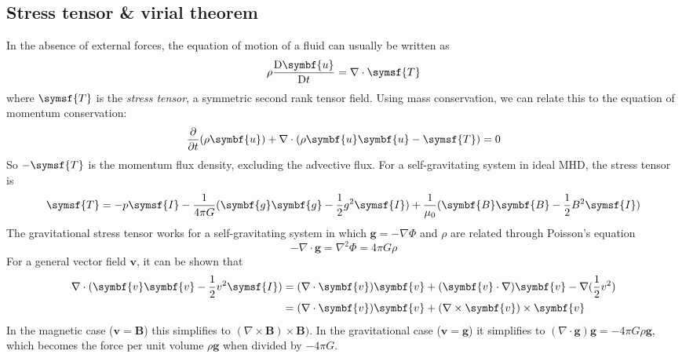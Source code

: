 \documentclass{jknotes}
\newcommand{\B}{\symbf{B}}
\renewcommand{\u}{\symbf{u}}
\begin{document}
\subsection{Stress tensor \& virial theorem}
In the absence of external forces, the equation of motion of a fluid can
usually be written as
\begin{equation}
	\rho \frac{\diffD \u}{\diffD t} = \nabla \cdot \symsf{T}
\end{equation}
where $\symsf{T}$  is the \emph{stress tensor}, a symmetric second rank tensor
field. Using mass conservation, we can relate this to the equation of momentum
conservation:
\begin{equation}
	\frac{\partial}{\partial t}(\rho \u) + \nabla \cdot (\rho \u \u -
	\symsf{T}) = 0
\end{equation}
So $-\symsf{T}$ is the momentum flux density, excluding the advective flux.
For a self-gravitating system in ideal MHD, the stress tensor is
\begin{equation}
	\symsf{T} = -p \symsf{I} - \frac{1}{4\pi G}
	(\symbf{g}\symbf{g}-\frac{1}{2}g^2 \symsf{I}) +
	\frac{1}{\mu_0}(\B\B-\frac{1}{2}B^2\symsf{I})
\end{equation}
The gravitational stress tensor works for a self-gravitating system in which
$\symbf{g} = - \nabla \Phi$ and $\rho$ are related through Poisson's equation
\begin{equation}
	-\nabla \cdot \symbf{g} = \nabla^2 \Phi = 4\pi G \rho
\end{equation}
For a general vector field $\symbf{v}$, it can be shown that
\begin{align}
	\nabla \cdot (\symbf{v}\symbf{v}-\frac{1}{2}v^2 \symsf{I}) 
	&= (\nabla \cdot \symbf{v})\symbf{v} + (\symbf{v}\cdot\nabla)\symbf{v} -
	\nabla(\frac{1}{2}v^2) \\
	&= (\nabla \cdot \symbf{v})\symbf{v} + (\nabla \times
	\symbf{v})\times\symbf{v}
\end{align}
In the magnetic case ($\symbf{v} = \B$) this simplifies to $(\nabla \times
\B)\times \B)$. In the gravitational case ($\symbf{v} = \symbf{g}$) it
simplifies to $(\nabla \cdot \symbf{g})\symbf{g} = - 4\pi G \rho \symbf{g}$,
which becomes the force per unit volume $\rho \symbf{g}$ when divided by
$-4\pi G$.
\end{document}

